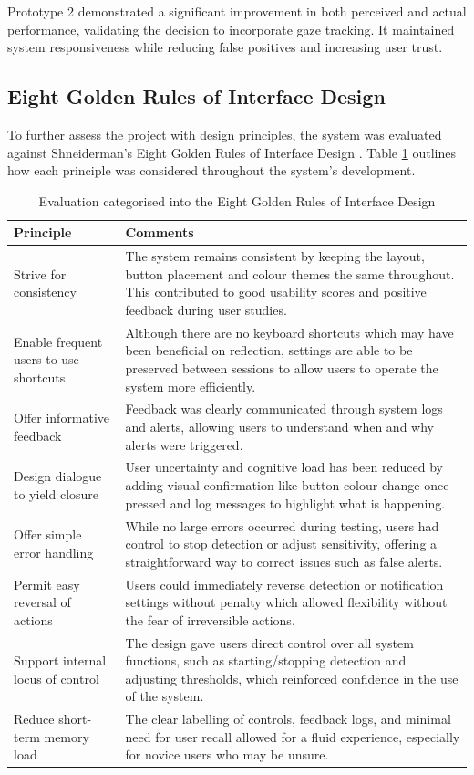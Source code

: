 \documentclass[12pt]{article}
\theoremstyle{plain}
\theoremstyle{definition}
\begin{document}
Prototype 2 demonstrated a significant improvement in both perceived and actual performance, validating the decision to incorporate gaze tracking. It maintained system responsiveness while reducing false positives and increasing user trust.

\subsection{Eight Golden Rules of Interface Design}
\label{8_golden_rules}

To further assess the project with design principles, the system was evaluated against Shneiderman’s Eight Golden Rules of Interface Design \cite{}. Table \ref{golden_rules} outlines how each principle was considered throughout the system’s development.

\begin{table}[h!]
\centering
\begin{tabularx}{\textwidth}{|l|X|}
\hline
\textbf{Principle} & \textbf{Comments} \\
\hline
Strive for consistency & The system remains consistent by keeping the layout, button placement and colour themes the same throughout. This contributed to good usability scores and positive feedback during user studies. \\
\hline
Enable frequent users to use shortcuts & Although there are no keyboard shortcuts which may have been beneficial on reflection, settings are able to be preserved between sessions to allow users to operate the system more efficiently. \\
\hline
Offer informative feedback & Feedback was clearly communicated through system logs and alerts, allowing users to understand when and why alerts were triggered. \\
\hline
Design dialogue to yield closure & User uncertainty and cognitive load has been reduced by adding visual confirmation like button colour change once pressed and log messages to highlight what is happening. \\
\hline
Offer simple error handling & While no large errors occurred during testing, users had control to stop detection or adjust sensitivity, offering a straightforward way to correct issues such as false alerts. \\
\hline
Permit easy reversal of actions & Users could immediately reverse detection or notification settings without penalty which allowed flexibility without the fear of irreversible actions. \\
\hline
Support internal locus of control & The design gave users direct control over all system functions, such as starting/stopping detection and adjusting thresholds, which reinforced confidence in the use of the system. \\
\hline
Reduce short-term memory load & The clear labelling of controls, feedback logs, and minimal need for user recall allowed for a fluid experience, especially for novice users who may be unsure. \\
\hline
\end{tabularx}
\caption{Evaluation categorised into the Eight Golden Rules of Interface Design \cite{} }
\label{golden_rules}
\end{table}
\end{document}
